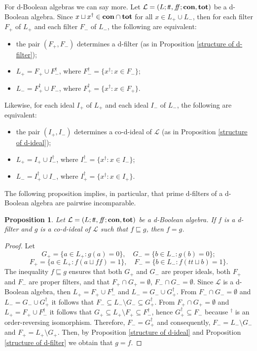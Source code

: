 \documentclass[11pt]{article}
\theoremstyle{plain}
\newtheorem{prop}[thm]{Proposition}
\theoremstyle{definition}
\newcommand{\dbt}{{t\!t}}
\newcommand{\dbf}{{f\!\!f}}
\begin{document}
For d-Boolean algebras we can say more. Let $\mathcal{L}=(L;\dbt,\dbf;{\bf con},{\bf tot})$ be a d-Boolean algebra. Since $x\sqcup x^\dag\in{\bf con}\cap{\bf tot}$ for all $x\in L_+\cup L_-$, then for each filter $F_+$ of $L_+$ and each filter $F_-$ of $L_-$, the following are equivalent: 
\begin{itemize} \setlength{\itemsep}{0pt} 
\item the pair $(F_+,F_-)$ determines a  d-filter (as in Proposition \ref{structure of d-filter}); 
\item  $L_+=F_+\cup F_-^\dag$, where $F_-^\dag= \{x^\dag: x\in F_-\}$; 
\item $L_-=F_+^\dag\cup F_-$, where  $F_+^\dag= \{x^\dag: x\in F_+\}$. \end{itemize} 
Likewise, for each ideal $I_+$ of $L_+$ and each ideal $I_-$ of $L_-$, the following are equivalent: 
\begin{itemize} \setlength{\itemsep}{0pt} 
\item the pair $(I_+,I_-)$ determines a  co-d-ideal of $\mathcal{L}$  (as in Proposition \ref{structure of d-ideal}); 
\item    $L_+=I_+\cup I_-^\dag$, where $I_-^\dag= \{x^\dag: x\in I_-\}$; 
\item   $L_-=I_+^\dag\cup I_-$, where $I_+^\dag= \{x^\dag: x\in I_+\}$. \end{itemize} 

The following proposition implies, in particular, that prime d-filters of a d-Boolean algebra are pairwise incomparable.
\begin{prop}\label{dBA-IF} Let $\mathcal{L}=(L;\dbt,\dbf;{\bf con},{\bf tot})$ be a d-Boolean algebra.  If $f$ is a  d-filter and $g$ is a  co-d-ideal  of $\mathcal{L}$ such that $f\sqsubseteq g$, then $f=g$. \end{prop}

\begin{proof} Let $$G_+=\{a\in L_+:g(a)=0\}, \quad G_-=\{b\in L_-:g(b)=0\};$$     $$F_+=\{a\in L_+:f(a\sqcup\dbf)=1\},\quad F_-=\{b\in L_-:f(\dbt\sqcup b)=1\}.$$ The inequality $f\sqsubseteq g$ ensures that both $G_+$ and $G_-$ are proper ideals, both $F_+$ and $F_-$ are proper filters, and that $F_+\cap G_+=\emptyset$, $F_-\cap G_-=\emptyset$. 
Since $\mathcal{L}$ is a d-Boolean algebra, then $L_+= F_+\cup F_-^\dag$ and $L_- = G_-\cup G_+^\dag$. From $F_-\cap G_-=\emptyset$ and $L_- = G_-\cup G_+^\dag$ it follows that $F_-\subseteq L_-\setminus G_-\subseteq G_+^\dag$. From $F_+\cap G_+=\emptyset$ and $L_+= F_+\cup F_-^\dag$ it follows that $G_+\subseteq L_+\setminus F_+\subseteq F_-^\dag$, hence  $G_+^\dag\subseteq   F_-$ because $^\dag$ is an order-reversing isomorphism. Therefore, $F_-= G_+^\dag$ and consequently, $F_-= L_-\setminus G_-$ and $F_+= L_+\setminus G_+$.  Then,  by Proposition \ref{structure of d-ideal} and Proposition \ref{structure of d-filter} we obtain that $g=f$.
\end{proof}
\end{document}
